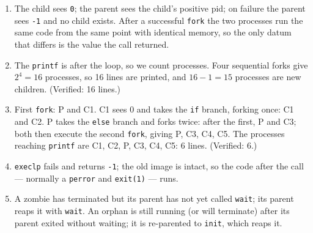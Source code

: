 \documentclass[11pt]{article}
\begin{document}
\begingroup\small
\begin{enumerate}
  \item The child sees \texttt{0}; the parent sees the child's positive pid;
        on failure the parent sees \texttt{-1} and no child exists. After a
        successful \texttt{fork} the two processes run the same code from the
        same point with identical memory, so the only datum that differs is
        the value the call returned.
  \item The \texttt{printf} is after the loop, so we count processes. Four
        sequential forks give $2^4 = 16$ processes, so 16 lines are printed,
        and $16 - 1 = 15$ processes are new children. (Verified: 16 lines.)
  \item First \texttt{fork}: P and C1. C1 sees 0 and takes the \texttt{if}
        branch, forking once: C1 and C2. P takes the \texttt{else} branch and
        forks twice: after the first, P and C3; both then execute the second
        \texttt{fork}, giving P, C3, C4, C5. The processes reaching
        \texttt{printf} are C1, C2, P, C3, C4, C5: 6 lines. (Verified: 6.)
  \item \texttt{execlp} fails and returns \texttt{-1}; the old image is
        intact, so the code after the call --- normally a \texttt{perror} and
        \texttt{exit(1)} --- runs.
  \item A zombie has terminated but its parent has not yet called
        \texttt{wait}; its parent reaps it with \texttt{wait}. An orphan is
        still running (or will terminate) after its parent exited without
        waiting; it is re-parented to \texttt{init}, which reaps it.
\end{enumerate}
\endgroup



\end{document}
